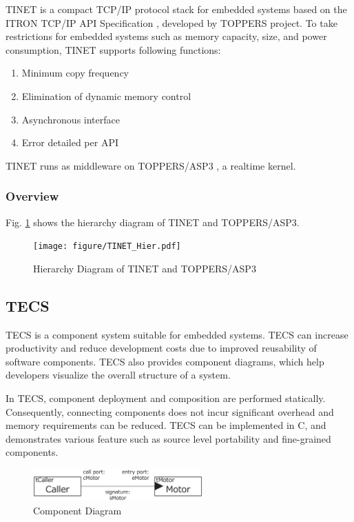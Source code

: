 \documentclass[conference]{IEEEtran/IEEEtran}
\begin{document}
TINET is a compact TCP/IP protocol stack for embedded systems based on the ITRON TCP/IP API Specification \cite{url:ITRON_TCP/IP_API_Spec}, developed by TOPPERS project.
To take restrictions for embedded systems such as memory capacity, size, and power consumption, TINET supports following functions:

\begin{enumerate}
    \item Minimum copy frequency
    \item Elimination of dynamic memory control
    \item Asynchronous interface
    \item Error detailed per API
\end{enumerate}


TINET runs as middleware on TOPPERS/ASP3 \cite{url:ASP3}, a realtime kernel.

\subsubsection{Overview}

Fig. \ref{fig:TINET_Hier} shows the hierarchy diagram of TINET and TOPPERS/ASP3.

\begin{figure}[t]
    \centering
    \texttt{[image: figure/TINET\_Hier.pdf]}
    \caption{Hierarchy Diagram of TINET and TOPPERS/ASP3}
    \label{fig:TINET_Hier}
\end{figure}


\subsection{TECS}
\label{sec:TECS}

TECS is a component system suitable for embedded systems.
TECS can increase productivity and reduce development costs due to improved reusability of software components.
TECS also provides component diagrams, which help developers visualize the overall structure of a system.

In TECS, component deployment and composition are performed statically.
Consequently, connecting components does not incur significant overhead and memory requirements can be reduced.
TECS can be implemented in C, and demonstrates various feature such as source level portability and fine-grained components.

\begin{figure}[t]
    \centering
    \includegraphics[width=6.5cm,clip]{figure/component_diagram.eps}
    \caption{Component Diagram}
    \label{fig:component}
\end{figure}
\end{document}
